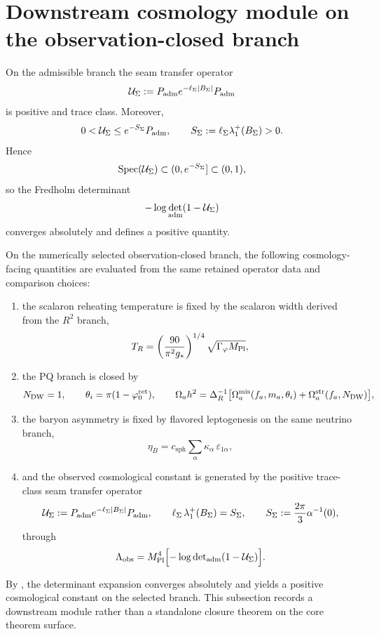 \section{Downstream cosmology module on the observation-closed branch}
\label{sec:cosmology-closure}

\begin{lemma}
\label{lem:automatic-seam-transfer-convergence}
On the admissible branch the seam transfer operator
\[
\mathcal U_\Sigma:=P_{\mathrm{adm}} e^{-\ell_\Sigma|B_\Sigma|}P_{\mathrm{adm}}
\]
is positive and trace class. Moreover,
\[
0<\mathcal U_\Sigma\le e^{-S_\Sigma}P_{\mathrm{adm}},
\qquad
S_\Sigma:=\ell_\Sigma\lambda_1^+(B_\Sigma)>0.
\]
Hence
\[
\mathrm{Spec}(\mathcal U_\Sigma)\subset (0,e^{-S_\Sigma}] \subset (0,1),
\]
so the Fredholm determinant
\[
-\log\det_{\mathrm{adm}}(1-\mathcal U_\Sigma)
\]
converges absolutely and defines a positive quantity.
\end{lemma}

\begin{proposition}
\label{thm:cosmology-closure}
On the numerically selected observation-closed branch, the following cosmology-facing quantities
are evaluated from the same retained operator data and comparison choices:
\begin{enumerate}[label=(\roman*), leftmargin=1.5em, topsep=3pt, itemsep=2pt]
    \item the scalaron reheating temperature is fixed by the scalaron width derived from the
    $R^2$ branch,
    \[
    T_R=
    \left(\frac{90}{\pi^2 g_\ast}\right)^{1/4}
    \sqrt{\Gamma_\varphi M_{\mathrm{Pl}}},
    \]
    \item the PQ branch is closed by
    \[
    N_{\mathrm{DW}}=1,
    \qquad
    \theta_i=\pi(1-\varphi_0^{\mathrm{ret}}),
    \qquad
    \Omega_a h^2=
    \Delta_R^{-1}
    \bigl[
    \Omega_a^{\mathrm{mis}}(f_a,m_a,\theta_i)
    +
    \Omega_a^{\mathrm{str}}(f_a,N_{\mathrm{DW}})
    \bigr],
    \]
    \item the baryon asymmetry is fixed by flavored leptogenesis on the same neutrino branch,
    \[
    \eta_B=c_{\mathrm{sph}}\sum_\alpha \kappa_\alpha\,\varepsilon_{1\alpha},
    \]
    \item and the observed cosmological constant is generated by the positive trace-class seam
    transfer operator
    \[
    \mathcal U_\Sigma:=P_{\mathrm{adm}} e^{-\ell_\Sigma |B_\Sigma|}P_{\mathrm{adm}},
    \qquad
    \ell_\Sigma\,\lambda_1^+(B_\Sigma)=S_\Sigma,
    \qquad
    S_\Sigma:=\frac{2\pi}{3}\alpha^{-1}(0),
    \]
    through
    \[
    \Lambda_{\mathrm{obs}}
    =
    M_{\mathrm{Pl}}^4
    \Bigl[-\log\det\nolimits_{\mathrm{adm}}(1-\mathcal U_\Sigma)\Bigr].
    \]
\end{enumerate}
By , the determinant expansion converges
absolutely and yields a positive cosmological constant on the selected branch. This subsection
records a downstream module rather than a standalone closure theorem on the core theorem surface.
\end{proposition}

